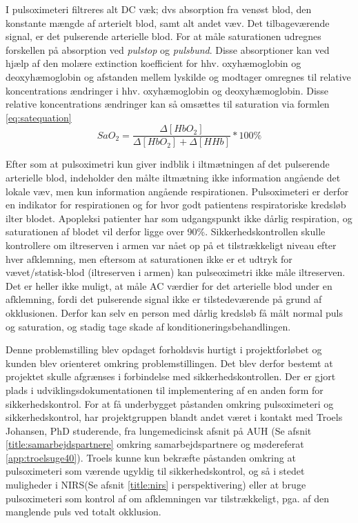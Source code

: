 I pulsoximeteri filtreres alt DC væk; dvs absorption fra venøst blod, den konstante mængde af arterielt blod, samt alt andet væv. Det tilbageværende signal, er det pulserende arterielle blod. For at måle saturationen udregnes forskellen på absorption ved \textit{pulstop} og \textit{pulsbund}. Disse absorptioner kan ved hjælp af den molære extinction koefficient for hhv. oxyhæmoglobin og deoxyhæmoglobin og afstanden mellem lyskilde og modtager omregnes til relative koncentrations ændringer i hhv. oxyhæmoglobin og deoxyhæmoglobin. Disse relative koncentrations ændringer kan så omsættes til saturation via formlen \ref{eq:satequation}
\begin{equation}
	SaO_2 = \frac{\Delta[HbO_2]}{\Delta[HbO_2]+\Delta[HHb]} *100\%
	\label{eq:satequation}
\end{equation}

Efter som at pulsoximetri kun giver indblik i iltmætningen af det pulserende arterielle blod, indeholder den målte iltmætning ikke information angående det lokale væv, men kun information angående respirationen. Pulsoximeteri er derfor en indikator for respirationen og for hvor godt patientens respiratoriske kredsløb ilter blodet. Apopleksi patienter har som udgangspunkt ikke dårlig respiration, og saturationen af blodet vil derfor ligge over 90\%. Sikkerhedskontrollen skulle kontrollere om iltreserven i armen var nået op på et tilstrækkeligt niveau efter hver afklemning, men eftersom at saturationen ikke er et udtryk for vævet/statisk-blod (iltreserven i armen) kan pulseoximetri ikke måle iltreserven.
Det er heller ikke muligt, at måle AC værdier for det arterielle blod under en afklemning, fordi det pulserende signal ikke er tilstedeværende på grund af okklusionen. Derfor kan selv en person med dårlig kredsløb få målt normal puls og saturation, og stadig tage skade af konditioneringsbehandlingen. 

Denne problemstilling blev opdaget forholdsvis hurtigt i projektforløbet og kunden blev orienteret omkring problemstillingen. Det blev derfor bestemt at projektet skulle afgrænses i forbindelse med sikkerhedskontrollen. Der er gjort plads i udviklingsdokumentationen til implementering af en anden form for sikkerhedskontrol. For at få underbygget påstanden omkring pulsoximeteri og sikkerhedskontrol, har projektgruppen blandt andet været i kontakt med Troels Johansen, PhD studerende, fra lungemedicinsk afsnit på AUH (Se afsnit \ref{title:samarbejdspartnere} omkring samarbejdspartnere og mødereferat \ref{app:troelsuge40}). Troels kunne kun bekræfte påstanden omkring at pulsoximeteri som værende ugyldig til sikkerhedskontrol, og så i stedet muligheder i NIRS(Se afsnit \ref{title:nirs} i perspektivering) eller at bruge pulsoximeteri som kontrol af om afklemningen var tilstrækkeligt, pga. af den manglende puls ved totalt okklusion.

